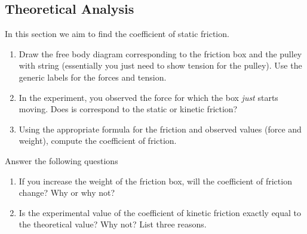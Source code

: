 \documentclass[10pt]{article}
\begin{document}
\subsection{Theoretical Analysis}
In this section we aim to find the coefficient of static friction.
\begin{enumerate}
\item Draw the free body diagram corresponding to the friction box and the pulley with string (essentially you just need to show tension for the pulley).  Use the generic labels for the forces and tension.
\vspace{250px}
\item In the experiment, you observed the force for which the box \emph{just} starts moving.  Does is correspond to the static or kinetic friction?  
\vspace{50px}
\item Using the appropriate formula for the friction and observed values (force and weight), compute the coefficient of friction.
\vspace{250px}  
\end{enumerate}
Answer the following questions
\begin{enumerate}
\item If you increase the weight of the friction box, will the coefficient of friction change?  Why or why not?
\vspace{100px}
\item Is the experimental value of the coefficient of kinetic friction exactly equal to the theoretical value?  Why not? List three reasons.
\end{enumerate}
\end{document}
